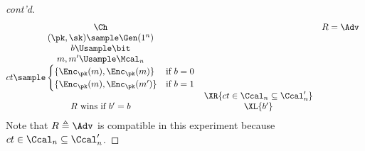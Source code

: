 \begin{answer}[iv]
\begin{proof}[cont'd]
        {
            \[
                \begin{array}{@{} c c c c c@{}}
                \Ch & &  R=\Adv \\
                (\pk, \sk)\sample \Gen(1^n) & &  \\
                b\Usample\bit  & &   \\
                m, m'\Usample\Mcal_n  & &   \\
                ct\sample \begin{cases}
                    \{\Enc_\pk(m), \Enc_\pk(m)\} & \textrm{if } b=0\\
                    \{\Enc_\pk(m), \Enc_\pk(m')\} & \textrm{if } b=1\\
                \end{cases}  & & \\
                & \XR{ct\in \Ccal_n\subseteq \Ccal'_n} & \\
                \text{$R$ wins if $b' = b$} & \XL{b'} & \\
                \end{array}
            \]
            \label{fig:p3-game7}
        }
        \noindent Note that $R\triangleq \Adv$ is compatible in this experiment because $ct\in \Ccal_n\subseteq \Ccal'_n$.


\end{proof}
\end{answer}
